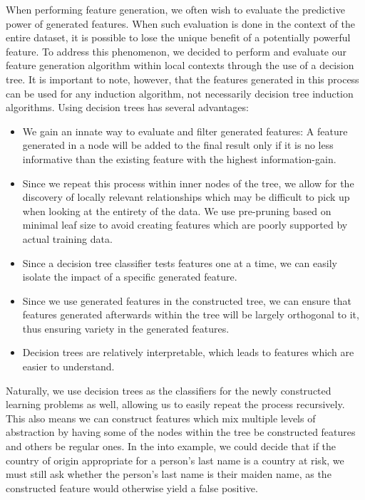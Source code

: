 \documentclass{article}
\theoremstyle{definition}
\begin{document}
When performing feature generation, we often wish to evaluate the predictive power of generated features. When such evaluation is done in the context of the entire dataset, it is possible to lose the unique benefit of a potentially powerful feature. To address this phenomenon, we decided to perform and evaluate our feature generation algorithm within local contexts through the use of a decision tree. It is important to note, however, that the features generated in this process can be used for any induction algorithm, not necessarily decision tree induction algorithms.
Using decision trees has several advantages: 
\begin{itemize}
	\item We gain an innate way to evaluate and filter generated features: A feature generated in a node will be added to the final result only if it is no less informative than the existing feature with the highest information-gain. %
	\item Since we repeat this process within inner nodes of the tree, we allow for the discovery of locally relevant relationships which may be difficult to pick up when looking at the entirety of the data. We use pre-pruning based on minimal leaf size to avoid creating features which are poorly supported by actual training data.
	\item Since a decision tree classifier tests features one at a time, we can easily isolate the impact of a specific generated feature.
	\item Since we use generated features in the constructed tree, we can ensure that features generated afterwards within the tree will be largely orthogonal to it, thus ensuring variety in the generated features. %
	\item Decision trees are relatively interpretable, which leads to features which are easier to understand.
\end{itemize}
Naturally, we use decision trees as the classifiers for the newly constructed learning problems as well, allowing us to easily repeat the process recursively. This also means we can construct features which mix multiple levels of abstraction by having some of the nodes within the tree be constructed features and others be regular ones. In the into example, we could decide that if the country of origin appropriate for a person's last name is a country at risk, we must still ask whether the person's last name is their maiden name, as the constructed feature would otherwise yield a false positive.
\end{document}
